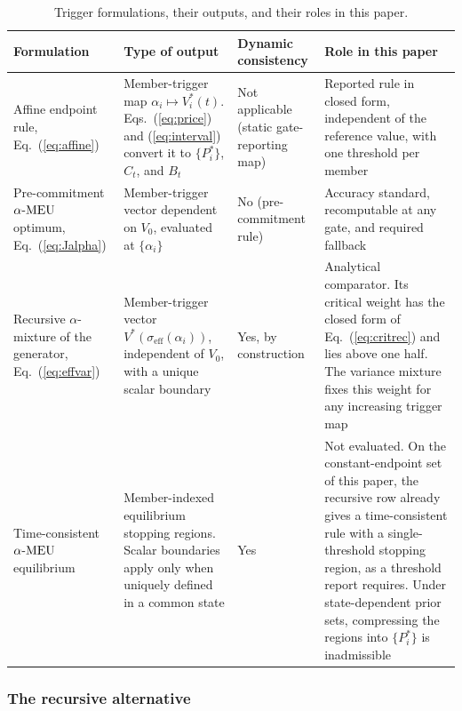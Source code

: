 \begin{table}[!t]
\caption{Trigger formulations, their outputs, and their roles in this paper.}
\label{tab:formulations}
\centering
\footnotesize
\renewcommand{\arraystretch}{1.15}
\begin{tabular}{@{}L{0.17\textwidth}L{0.25\textwidth}L{0.14\textwidth}L{0.36\textwidth}@{}}
\toprule
Formulation & Type of output & Dynamic consistency & Role in this paper\\
\midrule
Affine endpoint rule, Eq.~(\ref{eq:affine}) & Member-trigger map $\alpha_i\mapsto V^{*}_{i}(t)$. Eqs.~(\ref{eq:price}) and (\ref{eq:interval}) convert it to $\{P^{*}_{i}\}$, $C_t$, and $B_t$ & Not applicable (static gate-reporting map) & Reported rule in closed form, independent of the reference value, with one threshold per member\\
Pre-commitment $\alpha\text{-MEU}$ optimum, Eq.~(\ref{eq:Jalpha}) & Member-trigger vector dependent on $V_0$, evaluated at $\{\alpha_i\}$ & No (pre-commitment rule) & Accuracy standard, recomputable at any gate, and required fallback\\
Recursive $\alpha$-mixture of the generator, Eq.~(\ref{eq:effvar}) & Member-trigger vector $V^{*}(\sigma_{\mathrm{eff}}(\alpha_i))$, independent of $V_0$, with a unique scalar boundary & Yes, by construction & Analytical comparator. Its critical weight has the closed form of Eq.~(\ref{eq:critrec}) and lies above one half. The variance mixture fixes this weight for any increasing trigger map\\
Time-consistent $\alpha\text{-MEU}$ equilibrium \citep{HuangYu2021} & Member-indexed equilibrium stopping regions. Scalar boundaries apply only when uniquely defined in a common state & Yes & Not evaluated. On the constant-endpoint set of this paper, the recursive row already gives a time-consistent rule with a single-threshold stopping region, as a threshold report requires. Under state-dependent prior sets, compressing the regions into $\{P^{*}_{i}\}$ is inadmissible\\
\bottomrule
\end{tabular}
\end{table}

\subsubsection{The recursive alternative}

